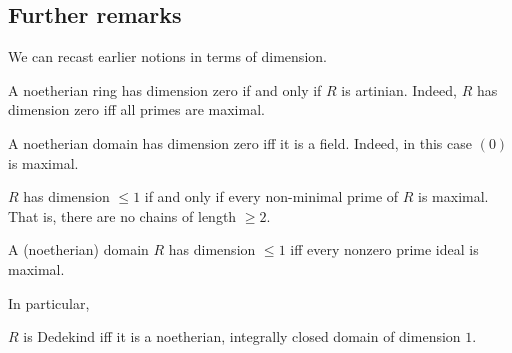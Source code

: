 \subsection{Further remarks}

We can recast earlier notions in terms of dimension.
\begin{remark} 
A noetherian ring has dimension zero if and only if $R$ is artinian. Indeed,
$R$ has dimension zero iff all primes are maximal.
\end{remark} 


\begin{remark} 
A noetherian domain has dimension zero iff it is a field. Indeed, in this case
$(0)$ is maximal.
\end{remark} 

\begin{remark} 
$R$ has dimension $\leq 1$ if and only if every non-minimal prime of $R$ is
maximal. That is, there are no chains of length $\geq 2$.
\end{remark} 

\begin{remark} 
A (noetherian) domain  $R$ has dimension $\leq 1$ iff every nonzero prime ideal
is maximal.
\end{remark} 

In particular,
\begin{proposition} 
$R$ is Dedekind iff it is a noetherian, integrally closed domain of dimension
$1$. 
\end{proposition} 


